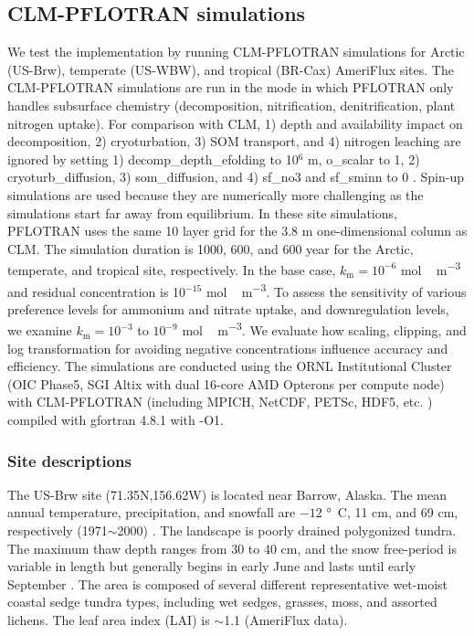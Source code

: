 \documentclass[gmd, manuscript]{copernicus}
\begin{document}
\subsection{CLM-PFLOTRAN simulations}
We test the implementation by running CLM-PFLOTRAN simulations for Arctic
(US-Brw), temperate (US-WBW), and tropical (BR-Cax) AmeriFlux sites. The
CLM-PFLOTRAN simulations are run in the mode in which PFLOTRAN only handles
subsurface chemistry (decomposition, nitrification, denitrification, plant
nitrogen uptake). For comparison with CLM, 1) depth and  availability
impact on decomposition, 2) cryoturbation, 3) SOM transport, and 4) nitrogen
leaching are ignored by setting 1) decomp\_depth\_efolding to 10$^6$ m,
o\_scalar to 1, 2) cryoturb\_diffusion, 3) som\_diffusion, and 4) sf\_no3 and
sf\_sminn to 0 \citep{Oleson2013}. Spin-up simulations are used because they are numerically more
challenging  as the simulations start far away from equilibrium. In these
site simulations, PFLOTRAN uses the same 10 layer grid for the 3.8 m
one-dimensional column as CLM. The simulation duration is 1000, 600, and 600
year for the Arctic, temperate, and tropical site, respectively.
In the base case, $k_\text{m}=10^{-6}$ \unit{mol\,m^{-3}} and
residual concentration is 10$^{-15}$ \unit{mol\,m^{-3}}. To assess the sensitivity
of various preference levels for ammonium and nitrate uptake, and
downregulation levels, we examine  $k_\text{m}=10^{-3}$ to $10^{-9}$
\unit{mol\,m^{-3}}. We evaluate how scaling, clipping, and log transformation for
avoiding negative concentrations influence accuracy and efficiency.
The simulations are conducted using the ORNL Institutional Cluster (OIC Phase5,
SGI Altix with dual 16-core AMD Opterons per compute node) with CLM-PFLOTRAN
(including MPICH, NetCDF, PETSc, HDF5, etc. ) compiled with gfortran 4.8.1
with -O1.  

\subsubsection{Site descriptions}
The US-Brw site (71.35N,156.62W) is located near Barrow, Alaska. The mean annual
temperature, precipitation, and snowfall are $-12$ \unit{\degree C}, 11 cm, and
69 cm, respectively (1971$\sim$2000) \citep{Lara2012}. The landscape is poorly
drained polygonized tundra. The maximum thaw depth ranges from 30 to 40 cm, and the
snow free-period is variable in length but generally begins in early June and
lasts until early September \citep{Hinkel2003}. The area is composed of several
different representative wet-moist coastal sedge tundra types, including wet
sedges, grasses, moss, and assorted lichens. The leaf area index (LAI) is
$\sim$1.1 (AmeriFlux data).
\end{document}
